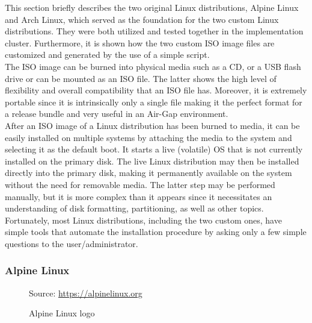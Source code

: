 This section briefly describes the two original Linux distributions, Alpine
Linux and Arch Linux, which served as the foundation for the two custom Linux distributions.
They were both utilized and tested together in the implementation cluster. Furthermore,
it is shown how the two custom ISO image files are customized and generated by
the use of a simple script. \\ %
The ISO image can be burned into physical media such as a CD, or a USB flash drive
or can be mounted as an ISO file. The latter shows the high level of flexibility
and overall compatibility that an ISO file has. Moreover, it is extremely
portable since it is intrinsically only a single file making it the perfect
format for a release bundle and very useful in an Air-Gap environment. \\ %
After an ISO image of a Linux distribution has been burned to media, it can be easily
installed on multiple systems by attaching the media to the system and selecting
it as the default boot. It starts a live (volatile) OS that is not currently
installed on the primary disk. The live Linux distribution may then be installed
directly into the primary disk, making it permanently available on the system
without the need for removable media. The latter step may be performed manually,
but it is more complex than it appears since it necessitates an understanding of
disk formatting, partitioning, as well as other topics. Fortunately, most Linux
distributions, including the two custom ones, have simple tools that automate
the installation procedure by asking only a few simple questions to the user/administrator.

\clearpage


\subsubsection{Alpine Linux}
\label{subsubsec:implementation_distributions_iso_alpine_linux}

\begin{figure} %
  \centering
  \def\stackalignment{r} %
  {\scriptsize \parbox[t]{\linewidth}{ Source: \url{https://alpinelinux.org}} }
  \caption{Alpine Linux logo}
\end{figure}

